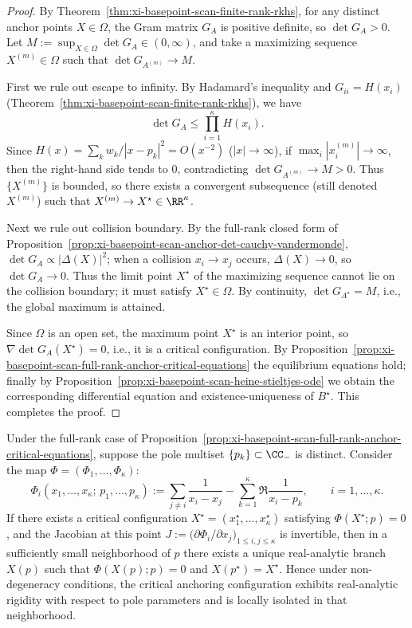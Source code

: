 \begin{proof}
By Theorem~\ref{thm:xi-basepoint-scan-finite-rank-rkhs}, for any distinct anchor points \(X\in\Omega\), the Gram matrix \(G_A\) is positive definite, so \(\det G_A>0\).
Let \(M:=\sup_{X\in\Omega}\det G_A\in(0,\infty)\), and take a maximizing sequence \(X^{(m)}\in\Omega\) such that \(\det G_{A^{(m)}}\to M\).
\par
First we rule out escape to infinity.
By Hadamard's inequality and \(G_{ii}=H(x_i)\) (Theorem~\ref{thm:xi-basepoint-scan-finite-rank-rkhs}), we have
\[
\det G_A\le \prod_{i=1}^{\kappa}H(x_i).
\]
Since \(H(x)=\sum_k w_k/|x-p_k|^2=O(x^{-2})\) (\(|x|\to\infty\)), if \(\max_i|x_i^{(m)}|\to\infty\), then the right-hand side tends to \(0\), contradicting \(\det G_{A^{(m)}}\to M>0\).
Thus \(\{X^{(m)}\}\) is bounded, so there exists a convergent subsequence (still denoted \(X^{(m)}\)) such that \(X^{(m)}\to X^\star\in\RR^\kappa\).
\par
Next we rule out collision boundary.
By the full-rank closed form of Proposition~\ref{prop:xi-basepoint-scan-anchor-det-cauchy-vandermonde},
\(
\det G_A\propto |\Delta(X)|^2
\);
when a collision \(x_i\to x_j\) occurs, \(\Delta(X)\to 0\), so \(\det G_A\to 0\).
Thus the limit point \(X^\star\) of the maximizing sequence cannot lie on the collision boundary; it must satisfy \(X^\star\in\Omega\).
By continuity, \(\det G_{A^\star}=M\), i.e., the global maximum is attained.
\par
Since \(\Omega\) is an open set, the maximum point \(X^\star\) is an interior point, so \(\nabla \det G_A(X^\star)=0\), i.e., it is a critical configuration.
By Proposition~\ref{prop:xi-basepoint-scan-full-rank-anchor-critical-equations} the equilibrium equations hold; finally by Proposition~\ref{prop:xi-basepoint-scan-heine-stieltjes-ode} we obtain the corresponding differential equation and existence-uniqueness of \(B^\star\). This completes the proof.
\end{proof}
\begin{proposition}\label{prop:xi-basepoint-scan-critical-configuration-analytic-rigidity}
Under the full-rank case of Proposition~\ref{prop:xi-basepoint-scan-full-rank-anchor-critical-equations}, suppose the pole multiset \(\{p_k\}\subset\CC_{-}\) is distinct.
Consider the map \(\Phi=(\Phi_1,\dots,\Phi_\kappa)\):
\[
\Phi_i(x_1,\dots,x_\kappa;\,p_1,\dots,p_\kappa)
:=\sum_{j\ne i}\frac{1}{x_i-x_j}-\sum_{k=1}^{\kappa}\Re\frac{1}{x_i-p_k},
\qquad i=1,\dots,\kappa.
\]
If there exists a critical configuration \(X^\star=(x_1^\star,\dots,x_\kappa^\star)\) satisfying \(\Phi(X^\star;p)=0\), and the Jacobian at this point
\(
J:=\bigl(\partial \Phi_i/\partial x_j\bigr)_{1\le i,j\le \kappa}
\)
is invertible, then in a sufficiently small neighborhood of \(p\) there exists a unique real-analytic branch \(X(p)\) such that \(\Phi(X(p);p)=0\) and \(X(p^\star)=X^\star\).
Hence under non-degeneracy conditions, the critical anchoring configuration exhibits real-analytic rigidity with respect to pole parameters and is locally isolated in that neighborhood.
\end{proposition}
